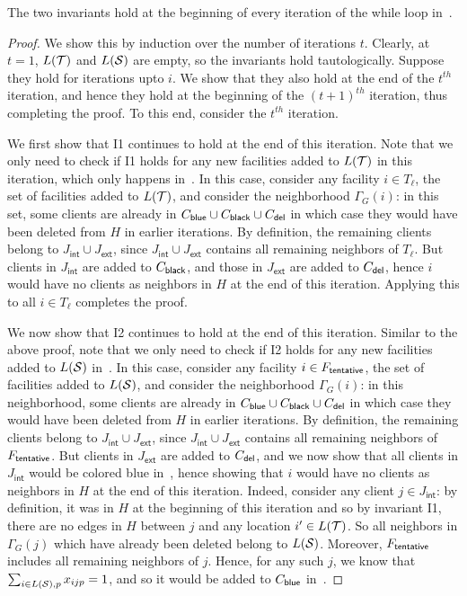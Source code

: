 \begin{claim}
\label{fcl:inv}
The two invariants hold at the beginning of every iteration of the while loop in~.
\end{claim}
\begin{proof}
We show this by induction over the number of iterations $t$. Clearly, at $t=1$, $L({\cal T})$ and $L({\cal S})$ are empty, so the invariants hold tautologically. Suppose they hold for iterations upto $i$. We show that they also hold at the end of the $t^{th}$ iteration, and hence they hold at the beginning of the $(t+1)^{th}$ iteration, thus completing the proof. To this end, consider the $t^{th}$ iteration.

\medskip \noindent We first show that I1 continues to hold at the end of this iteration. Note that we only need to check if I1 holds for any new facilities added to $L({\cal T})$ in this iteration, which only happens in~. In this case, consider any facility $i \in T_\ell$, the set of facilities added to $L({\cal T})$, and consider the neighborhood $\Gamma_G(i)$: in this set, some clients are already in $C_{\mathsf{blue}} \cup C_{\mathsf{black}} \cup C_{\mathsf{del}}$ in which case they would have been deleted from $H$ in earlier iterations. By definition, the remaining clients belong to $J_\mathsf{int} \cup J_\mathsf{ext}$, since $J_\mathsf{int} \cup J_\mathsf{ext}$ contains all remaining neighbors of $T_\ell$. But clients in $J_\mathsf{int} $ are added to $C_{\mathsf{black}}$, and those in $ J_\mathsf{ext}$ are added to $C_{\mathsf{del}}$, hence $i$ would have no  clients as neighbors in $H$ at the end of this iteration. Applying this to all $i \in T_\ell$ completes the proof.

\medskip \noindent We now show that I2 continues to hold at the end of this iteration. Similar to the above proof, note that we only need to check if I2 holds for any new facilities added to $L({\cal S})$ in~. In this case, consider any facility $i \in F_\mathsf{tentative}$, the set of facilities added to $L({\cal S})$, and consider the neighborhood $\Gamma_G(i)$: in this neighborhood, some clients are already in $C_{\mathsf{blue}} \cup C_{\mathsf{black}} \cup C_{\mathsf{del}}$ in which case they would have been deleted from $H$ in earlier iterations. By definition, the remaining clients belong to $J_\mathsf{int} \cup J_\mathsf{ext}$, since $J_\mathsf{int} \cup J_\mathsf{ext}$ contains all remaining neighbors of $F_\mathsf{tentative}$. But clients in $J_\mathsf{ext}$ are added to $C_{\mathsf{del}}$, and we now show that all clients in $J_\mathsf{int}$ would be colored blue in~, hence showing that $i$ would have no clients as neighbors in $H$ at the end of this iteration.
Indeed, consider any client $j \in J_\mathsf{int}$: by definition, it was in $H$ at the beginning of this iteration and so by invariant I1, there are no edges in $H$ between $j$ and any location $i' \in L({\cal T})$. So all neighbors in $\Gamma_G(j)$ which have already been deleted belong to $L({\cal S})$. Moreover, $F_\mathsf{tentative}$ includes all remaining neighbors of $j$. Hence, for any such $j$, we know that $\sum_{i \in L({\cal S}), p} x_{ijp} = 1$, and so it would be
added to $C_{\mathsf{blue}}$ in~.
\end{proof}

